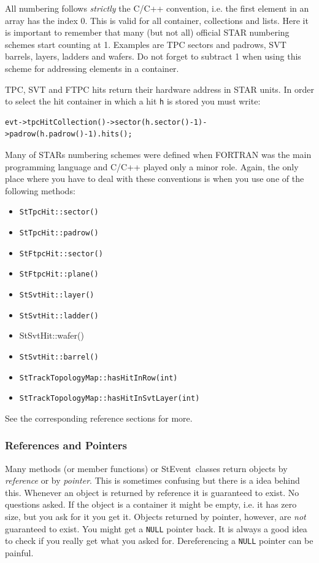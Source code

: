 \documentclass[twoside]{article}
\newcommand{\StEvent}{\textsf{StEvent}}
\begin{document}
All numbering follows \emph{strictly} the C/C++ convention, i.e. the
first element in an array has the index 0. This is valid for all
container, collections and lists. Here it is important to remember
that many (but not all) official STAR numbering schemes start counting
at 1.  Examples are TPC sectors and padrows, SVT barrels, layers, ladders and
wafers. Do not forget to subtract 1 when using this scheme for
addressing elements in a container.

TPC, SVT and FTPC hits return their hardware address in STAR units.
In order to select the hit container in which a hit \texttt{h} is
stored you must write:
\begin{verbatim}
evt->tpcHitCollection()->sector(h.sector()-1)->padrow(h.padrow()-1).hits();
\end{verbatim}

Many of STARs numbering schemes were defined when FORTRAN was the main
programming language and C/C++ played only a minor role. Again, the only
place where you have to deal with these conventions is when you use one of the
following methods:
\begin{itemize}
\item \texttt{StTpcHit::sector()}
\item \texttt{StTpcHit::padrow()}
\item \texttt{StFtpcHit::sector()}
\item \texttt{StFtpcHit::plane()}
\item \texttt{StSvtHit::layer()}
\item \texttt{StSvtHit::ladder()}
\item \textrm{StSvtHit::wafer(})
\item \texttt{StSvtHit::barrel()}
\item \texttt{StTrackTopologyMap::hasHitInRow(int)}
\item \texttt{StTrackTopologyMap::hasHitInSvtLayer(int)}
\end{itemize}
See the corresponding reference sections for more.

\subsubsection{References and Pointers}
 

Many methods (or member functions) or \StEvent\ classes return objects
by \emph{reference} or by \emph{pointer}. This is sometimes confusing
but there is a idea behind this. Whenever an object is returned by
reference it is guaranteed to exist. No questions asked. If the object
is a container it might be empty, i.e. it has zero size, but you ask
for it you get it. Objects returned by pointer, however, are
\emph{not} guaranteed to exist. You might get a \texttt{NULL} pointer
back.  It is always a good idea to check if you really get what you
asked for.  Dereferencing a \texttt{NULL} pointer can be painful.
\end{document}
